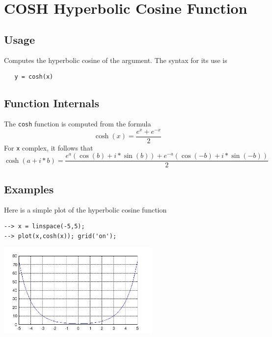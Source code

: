 \section{COSH Hyperbolic Cosine Function}

\subsection{Usage}

Computes the hyperbolic cosine of the argument.
The syntax for its use is
\begin{verbatim}
   y = cosh(x)
\end{verbatim}
\subsection{Function Internals}

The \verb|cosh| function is computed from the formula
\[
   \cosh(x) = \frac{e^x+e^{-x}}{2}
\]
For \verb|x| complex, it follows that
\[
   \cosh(a+i*b) = \frac{e^a(\cos(b)+i*\sin(b)) + e^{-a}(\cos(-b)+i*\sin(-b))}{2}
\]
\subsection{Examples}

Here is a simple plot of the hyperbolic cosine function
\begin{verbatim}
--> x = linspace(-5,5);
--> plot(x,cosh(x)); grid('on');
\end{verbatim}


\centerline{\includegraphics[width=8cm]{coshplot}}

